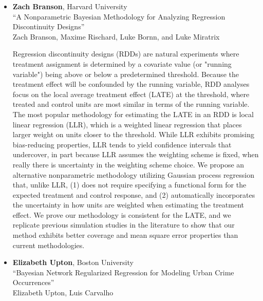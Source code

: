 \begin{itemize}
\item \textbf{Zach Branson}, Harvard University \\
``A Nonparametric Bayesian Methodology for Analyzing Regression Discontinuity Designs'' \\
Zach Branson, Maxime Rischard, Luke Bornn, and Luke Miratrix


Regression discontinuity designs (RDDs) are natural experiments where treatment assignment is determined by a covariate value (or "running variable") being above or below a predetermined threshold. Because the treatment effect will be confounded by the running variable, RDD analyses focus on the local average treatment effect (LATE) at the threshold, where treated and control units are most similar in terms of the running variable. The most popular methodology for estimating the LATE in an RDD is local linear regression (LLR), which is a weighted linear regression that places larger weight on units closer to the threshold. While LLR exhibits promising bias-reducing properties, LLR tends to yield confidence intervals that undercover, in part because LLR assumes the weighting scheme is fixed, when really there is uncertainty in the weighting scheme choice. We propose an alternative nonparametric methodology utilizing Gaussian process regression that, unlike LLR, (1) does not require specifying a functional form for the expected treatment and control response, and (2) automatically incorporates the uncertainty in how units are weighted when estimating the treatment effect.  We prove our methodology is consistent for the LATE, and we replicate previous simulation studies in the literature to show that our method exhibits better coverage and mean square error properties than current methodologies.

\pagebreak
\item \textbf{Elizabeth Upton}, Boston University \\
``Bayesian Network Regularized Regression for Modeling Urban Crime Occurrences'' \\
Elizabeth Upton, Luis Carvalho



\end{itemize}
